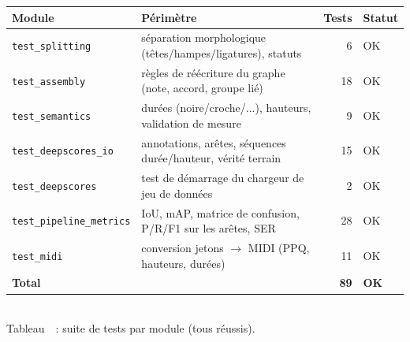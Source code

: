 \documentclass[a4paper,10pt]{article}
\begin{document}
\begin{center}
\label{tab:tests}%
\renewcommand{\arraystretch}{0.95}
\setlength{\tabcolsep}{4pt}
\small
\begin{tabular}{@{}l p{7.4cm} r l@{}}
\hline
\textbf{Module} & \textbf{Périmètre} & \textbf{Tests} & \textbf{Statut} \\
\hline
\texttt{test\_splitting}        & séparation morphologique (têtes/hampes/ligatures), statuts  & 6  & OK \\
\texttt{test\_assembly}          & règles de réécriture du graphe (note, accord, groupe lié)  & 18 & OK \\
\texttt{test\_semantics}         & durées (noire/croche/...), hauteurs, validation de mesure    & 9  & OK \\
\texttt{test\_deepscores\_io}    & annotations, arêtes, séquences durée/hauteur, vérité terrain& 15 & OK \\
\texttt{test\_deepscores}        & test de démarrage du chargeur de jeu de données                & 2  & OK \\
\texttt{test\_pipeline\_metrics} & IoU, mAP, matrice de confusion, P/R/F1 sur les arêtes, SER   & 28 & OK \\
\texttt{test\_midi}              & conversion jetons $\to$ MIDI (PPQ, hauteurs, durées)       & 11 & OK \\
\hline
\textbf{Total}                   &                                                              & \textbf{89} & \textbf{OK} \\
\hline
\end{tabular}\\[3pt]
Tableau~\thetable~: suite de tests par module (tous réussis).
\end{center}

\newpage


\end{document}
